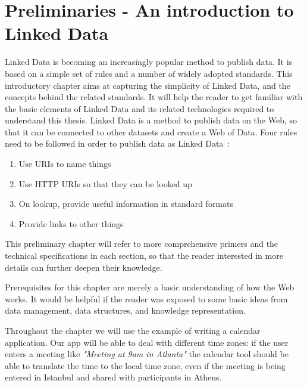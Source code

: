 \chapter{Preliminaries - An introduction to Linked Data}


Linked Data is becoming an increasingly popular method to publish data.
It is based on a simple set of rules and a number of widely adopted standards.
This introductory chapter aims at capturing the simplicity of Linked Data, and the concepts behind the related standards.
It will help the reader to get familiar with the basic elements of Linked Data and its related technologies required to understand this thesis.
Linked Data is a method to publish data on the Web, so that it can be connected to other datasets and create a Web of Data.
Four rules need to be followed in order to publish data as Linked Data~\cite{linkeddata-rules}:

\begin{enumerate}
\item Use URIs to name things
\item Use HTTP URIs so that they can be looked up
\item On lookup, provide useful information in standard formats
\item Provide links to other things
\end{enumerate}

This preliminary chapter will refer to more comprehensive primers and the technical specifications in each section, so that the reader interested in more details can further deepen their knowledge.

Prerequisites for this chapter are merely a basic understanding of how the Web works.
It would be helpful if the reader was exposed to some basic ideas from data management, data structures, and knowledge representation.

Throughout the chapter we will use the example of writing a calendar application.
Our app will be able to deal with different time zones:
if the user enters a meeting like \textit{"Meeting at 9am in Atlanta"} the calendar tool should be able to translate the time to the local time zone, even if the meeting is being entered in Istanbul and shared with participants in Athens.

